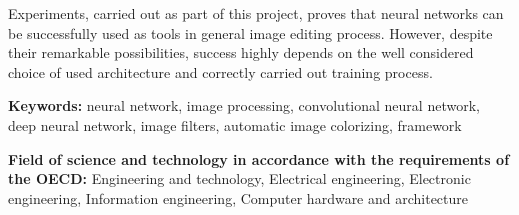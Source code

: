   Experiments, carried out as part of this project, proves that neural networks can
  be successfully used as tools in general image editing process. However, despite
  their remarkable possibilities, success highly depends on the well considered choice of used architecture
  and correctly carried out training process.

  \bigskip

  \noindent\textbf{Keywords:} neural network, image processing, convolutional
  neural network, deep neural network,
  image filters, automatic image colorizing, framework

  \bigskip

  \noindent\textbf{Field of science and technology in accordance with the
  requirements of the OECD:} Engineering and technology, Electrical engineering,
  Electronic engineering, Information engineering, Computer hardware and
  architecture

